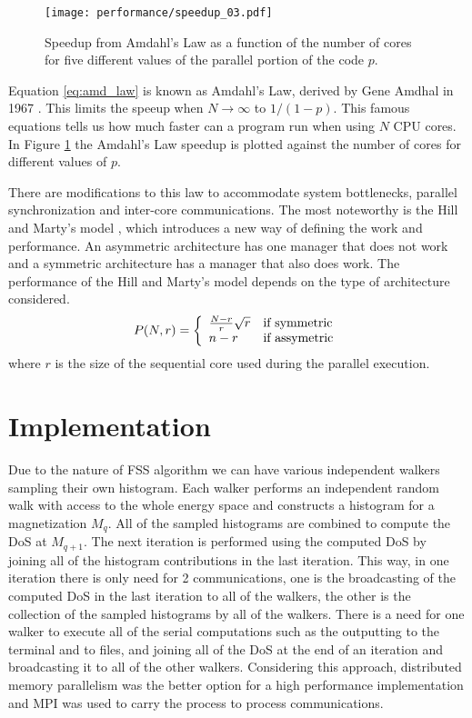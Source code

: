 \begin{figure}[h]
	\centering
	\texttt{[image: performance/speedup\_03.pdf]}
	\caption{Speedup from Amdahl's Law as a function of the number of cores for five different values of the parallel portion of the code $p$.}
	\label{amd_law}
\end{figure}

Equation \ref{eq:amd_law} is known as Amdahl's Law, derived by Gene Amdhal in 1967 \cite{Amdahl1967}. This limits the speeup when $N \rightarrow \infty$ to $1/(1-p)$. This famous equations tells us how much faster can a program run when using $N$ CPU cores. In Figure \ref{amd_law} the Amdahl's Law speedup is plotted against the number of cores for different values of $p$.

	There are modifications to this law \cite{On2014} to accommodate system bottlenecks, parallel synchronization and inter-core communications. The most noteworthy is the Hill and Marty's model \cite{Hill2008}, which introduces a new way of defining the work and performance. An asymmetric architecture has one manager that does not work and a symmetric architecture has a manager that also does work. The performance of the Hill and Marty's model depends on the type of architecture considered. 
\begin{equation}
		P(N, r) = \left\{ \begin{array}{ll}  \frac{N-r}{r} \sqrt{r}  & \mbox{if } \text{symmetric} \\ n-r & \mbox{if } \text{assymetric} \end{array} \right.
\end{equation}
where $r$ is the size of the sequential core used during the parallel execution. 


\section{Implementation}

	Due to the nature of FSS algorithm we can have various independent walkers sampling their own histogram. Each walker performs an independent random walk with access to the whole energy space and constructs a histogram for a magnetization $M_q$. All of the sampled histograms are combined to compute the DoS at $M_{q+1}$. The next iteration is performed using the computed DoS by joining all of the histogram contributions in the last iteration.
This way, in one iteration there is only need for 2 communications, one is the broadcasting of the computed DoS in the last iteration to all of the walkers, the other is the collection of the sampled histograms by all of the walkers. There is a need for one walker to execute all of the serial computations such as the outputting to the terminal and to files, and joining all of the DoS at the end of an iteration and broadcasting it to all of the other walkers. Considering this approach, distributed memory parallelism was the better option for a high performance implementation and MPI was used to carry the process to process communications.
	
